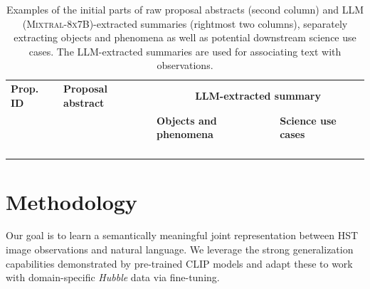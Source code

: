 \documentclass[10pt]{article} %
\newcommand{\hubble}{\emph{Hubble}\xspace}
\begin{document}
\begin{landscape}
      \begin{table}[h!]
          \centering
          \begin{tabular}{m{1.8cm} m{8cm} m{5cm} m{6cm}}
              \toprule
              \bfseries Prop. ID & \centering\arraybackslash \bfseries Proposal abstract & \multicolumn{2}{c}{\bfseries LLM-extracted summary} \tabularnewline
              \cmidrule(r){3-4}
              & & \centering\arraybackslash \bfseries Objects and phenomena & \centering\arraybackslash \bfseries Science use cases \tabularnewline
              \midrule
               & {\scriptsize } & {\scriptsize } & {\scriptsize } \tabularnewline
              \midrule
               & {\scriptsize } & {\scriptsize } & {\scriptsize } \tabularnewline
              \midrule
               & {\scriptsize } & {\scriptsize } & {\scriptsize } \tabularnewline
              \midrule
               & {\scriptsize } & {\scriptsize } & {\scriptsize } \tabularnewline
              \bottomrule
          \end{tabular}
          \caption{Examples of the initial parts of raw proposal abstracts (second column) and LLM (\textsc{Mixtral-8x7B})-extracted summaries (rightmost two columns), separately extracting objects and phenomena as well as potential downstream science use cases. The LLM-extracted summaries are used for associating text with observations.}
          \label{tab:datasetsumm}
      \end{table}
  \end{landscape}

\section{Methodology}
\label{sec:methodology}

Our goal is to learn a semantically  meaningful joint representation between HST image observations and natural language. We leverage the strong generalization capabilities demonstrated by pre-trained CLIP models and adapt these to work with domain-specific \hubble data via fine-tuning.
\end{document}
